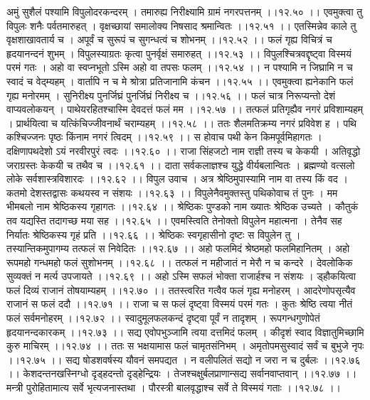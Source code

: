 \documentclass[11pt]{book}
\begin{document}
\begin{landscape}
अमुं सुशैलं पश्यामि विपुलोदरकन्दरम् ।
तमारुह्य निरीक्ष्यामि ग्रामं नगरपत्तनम् ।।१२.५० ।।
एवमुक्त्वा तु विपुलः शनैः पर्वतमारुहत् ।
वृक्षच्छायां समालोक्य निषसाद श्रमान्वितः ।।१२.५१ ।।
एतस्मिन्नेव काले तु वृक्षशाखावतार्य च ।
अपूर्वं च सुरूपं च सुगन्धत्वं च शोभनम् ।।१२.५२ ।।
फलं गृह्य विचित्रं च हृदयानन्दनं शुभम् ।
विपुलस्याग्रतः कृत्वा पुनर्वृक्षं समारुहत् ।।१२.५३ ।।
विपुलश्चित्रवद्दृष्ट्वा विस्मयं परमं गतः ।
अहो वा स्वप्नभूतो ऽस्मि अहो वा तपसः फलम् ।।१२.५४ ।।
न पश्यामि न जिघ्रामि न च स्वादं च वेद्म्यहम् ।
वार्तापि न च मे श्रोत्रा प्रतिजानामि कंचन ।।१२.५५ ।।
एवमुक्त्वा ह्यनेकानि फलं गृह्य मनोरमम् ।
सुनिरीक्ष्य पुनर्जिघ्रं पुनर्जिघ्रं निरीक्ष्य च ।।१२.५६ ।।
फलं चात्र निरूप्यन्तो देशं वाप्यवलोकयन् ।
पाथेयरहितश्चास्मि देवदत्तं फलं मम ।।१२.५७ ।।
तत्फलं प्रतिगृह्यैव नगरं प्रविशाम्यहम् ।
प्रार्थयित्वा च यत्किंचिज्जीवनार्थं चराम्यहम् ।।१२.५८ ।।
ततः शैलमतिक्रम्य नगरं प्रविवेश ह ।
पथि कश्चिज्जनः पृष्ठः किंनाम नगरं त्विदम् ।।१२.५९ ।।
स होवाच पथी केन किमपूर्वमिहागतः ।
दक्षिणापथदेशो ऽयं नरवीरपुरं त्वदः ।।१२.६० ।।
राजा सिंहजटो नाम राज्ञी तस्य च केकयी ।
अतिवृद्धो जराग्रस्तः केकयी च तथैव च ।।१२.६१ ।।
दाता सर्वकलाज्ञश्च युद्धे वीर्यबलान्वितः ।
ब्रह्मण्यो वत्सलो लोके सर्वशास्त्रविशारदः ।।१२.६२ ।।
विपुल उवाच ।
अत्र श्रेष्ठिमुपास्यामि नाम वा तस्य किं वद ।
कतमो देशस्तद्वासः कथयस्व न संशयः ।।१२.६३ ।।
विपुलेनैवमुक्तस्तु पथिकोवाच तं पुनः ।
मम भीमबलो नाम श्रेष्ठिकस्य गृहागतः ।।१२.६४ ।।
श्रेष्ठिकः पुण्डको नाम ख्यातः श्रेष्ठिक उच्यते ।
कौतुकं तव यद्यस्ति तदागच्छ मया सह ।।१२.६५ ।।
एवमस्त्विति तेनोक्तो विपुलेन महात्मना ।
तेनैव सह निर्यातः श्रेष्ठिकस्य गृहं प्रति ।।१२.६६ ।।
श्रेष्ठिकः स्वगृहासीनो दृष्टः स विपुलेन तु ।
तस्यान्तिकमुपागम्य तत्फलं स निवेदितः ।।१२.६७ ।।
अहो फलमिदं श्रेष्ठमहो फलमिहानितम् ।
अहो रूपमहो गन्धमहो फलं सुशोभनम् ।।१२.६८ ।।
तत्फलं न महीजातं न मेरौ न च कन्दरे ।
देवलोकिक सुव्यक्तं न मर्त्य उपजायते ।।१२.६९ ।।
अहो ऽस्मि सफलं भोक्ता राजार्हश्च न संशयः ।
ड्हौकयित्वा फलं दिव्यं राजानं तोषयाम्यहम् ।।१२.७० ।।
ततस्त्वरित गत्वैव फलं गृह्य मनोहरम् ।
आदरेणोपसृत्यैव राजानं स फलं ददौ ।।१२.७१ ।।
राजा च स फलं दृष्ट्वा विस्मयं परमं गतः ।
कुतः श्रेष्ठि त्वया नीतं फलं सर्वमनोहरम् ।।१२.७२ ।।
स्वादुमूलफलकन्दं दृष्ट्वा पूर्वं न तादृशम् ।
रूपगन्धगुणोपेतं हृदयानन्दकारकम् ।।१२.७३ ।।
सद्य एवोपभुञ्जामि त्वया दत्तमिदं फलम् ।
कीदृशं स्वाद विज्ञातुमिच्छामि कुरु माचिरम् ।।१२.७४ ।।
ततः स भक्षयामास फलं चामृतसंनिभम् ।
अमृतोपमसुस्वादं सर्वं च बुभुजे नृपः ।।१२.७५ ।।
सद्य षोडशवर्षस्य यौवनं समपद्यत ।
न वलीपलितं सद्यो न जरा न च दुर्बलः ।।१२.७६ ।।
केशदन्तनखस्निग्धो दृड्हदन्तो दृड्हेन्द्रियः ।
तेजश्चक्षुर्बलप्राणान्सद्य सर्वानवाप्तवान् ।।१२.७७ ।।
मन्त्री पुरोहितामात्य सर्वे भृत्यजनास्तथा ।
पौरस्त्री बालवृद्धाश्च सर्वे ते विस्मयं गताः ।।१२.७८ ।।

\end{landscape}
\end{document}
